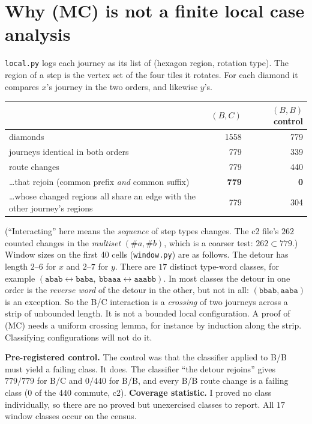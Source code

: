 \documentclass[11pt]{article}
\theoremstyle{definition}
\begin{document}
\section{Why (MC) is not a finite local case analysis}\label{sec:window}
\texttt{local.py} logs each journey as its list of (hexagon region, rotation type). The region of a step is the vertex set of the
four tiles it rotates. For each diamond it compares $x$'s journey in the two orders, and likewise $y$'s.
\begin{center}\begin{tabular}{lrr}\toprule
& $(B,C)$ & $(B,B)$ control\\\midrule
diamonds & 1558 & 779\\
journeys identical in both orders & 779 & 339\\
route changes & 779 & 440\\
\quad \ldots that rejoin (common prefix \emph{and} common suffix) & \textbf{779} & \textbf{0}\\
\quad \ldots whose changed regions all share an edge with the other journey's regions & 779 & 304\\
\bottomrule\end{tabular}\end{center}
(``Interacting'' here means the \emph{sequence} of step types changes. The c2 file's $262$ counted changes in the
\emph{multiset} $(\#a,\#b)$, which is a coarser test: $262\subset779$.) Window sizes on the first 40 cells (\texttt{window.py})
are as follows. The detour has length $2$--$6$ for $x$ and $2$--$7$ for $y$. There are $17$ distinct type-word classes,
for example $(\texttt{abab}\leftrightarrow\texttt{baba},\ \texttt{bbaaa}\leftrightarrow\texttt{aaabb})$. In most classes the
detour in one order is the \emph{reverse word} of the detour in the other, but not in all: $(\texttt{bbab},\texttt{aaba})$ is an
exception. So the B/C interaction is a \emph{crossing} of two journeys across a strip of unbounded length. It is not a bounded
local configuration. A proof of (MC) needs a uniform crossing lemma, for instance by induction along the strip. Classifying
configurations will not do it.

\textbf{Pre-registered control.} The control was that the classifier applied to B/B must yield a failing class. It does. The
classifier ``the detour rejoins'' gives $779/779$ for B/C and $0/440$ for B/B, and every B/B route change is a failing class
(0 of the 440 commute, c2). \textbf{Coverage statistic.} I proved no class individually, so there are no proved but unexercised classes to
report. All $17$ window classes occur on the census.
\end{document}

